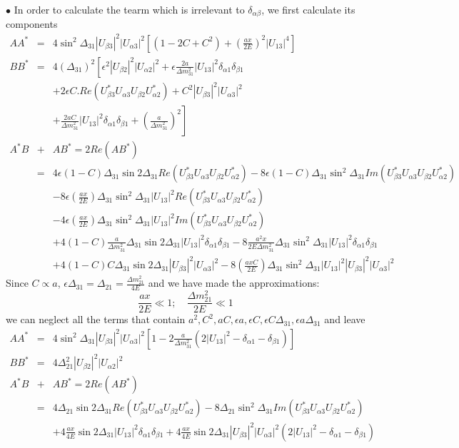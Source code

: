 \documentclass[a4 paper,12pt]{report}%
\begin{document}
$\bullet$ In order to calculate the tearm which is irrelevant to $\delta_{\alpha\beta}$, we first calculate its components
 \begin{eqnarray} \nonumber
AA^* &=&4\sin^2\Delta_{31}|U_{\beta 3}|^2|U_{\alpha 3}|^2\left[(1-2C+C^2) + \left(\frac{ax}{2E}\right)^2|U_{13}|^4\right]\\ \nonumber
BB^*& =&4(\Delta_{31})^2\left[\epsilon^2|U_{\beta 2}|^2|U_{\alpha 2}|^2 + \epsilon \frac{2a}{\Delta m^2_{31}}|U_{13}|^2\delta_{\alpha 1}\delta_{\beta 1}\right.\\ \nonumber
&&+2\epsilon C.Re(U^*_{\beta 3}U_{\alpha 3}U_{\beta 2}U^*_{\alpha 2}) + C^2|U_{\beta 3}|^2|U_{\alpha 3}|^2 \\ \nonumber
&&\left.+ \frac{2aC}{\Delta m^2_{31}}|U_{13}|^2\delta_{\alpha 1}\delta_{\beta 1}+\left(\frac{a}{\Delta m^2_{31}}\right)^2\right]\\ \nonumber
A^*B &+& AB^* = 2Re(AB^*)\\ \nonumber
&=&4\epsilon (1-C)\Delta_{31}\sin2\Delta_{31}Re(U^*_{\beta 3}U_{\alpha 3}U_{\beta 2}U^*_{\alpha 2}) - 8\epsilon (1-C)\Delta_{31}\sin^2\Delta_{31}Im(U^*_{\beta 3}U_{\alpha 3}U_{\beta 2}U^*_{\alpha 2})\\ \nonumber
&&-8\epsilon \left(\frac{ax}{2E}\right)\Delta_{31}\sin^2\Delta_{31}|U_{13}|^2Re(U^*_{\beta 3}U_{\alpha 3}U_{\beta 2}U^*_{\alpha 2})\\ \nonumber
&&-4\epsilon \left(\frac{ax}{2E}\right)\Delta_{31}\sin^2\Delta_{31}|U_{13}|^2Im(U^*_{\beta 3}U_{\alpha 3}U_{\beta 2}U^*_{\alpha 2})\\ \nonumber
&&+4(1-C)\frac{a}{\Delta m^2_{31}}\Delta_{31}\sin2\Delta_{31}|U_{13}|^2\delta_{\alpha 1}\delta_{\beta 1}-8\frac{a^2x}{2E\Delta m^2_{31}}\Delta_{31}\sin^2\Delta_{31}|U_{13}|^2\delta_{\alpha 1}\delta_{\beta 1}\\ \nonumber
&&+4(1-C)C\Delta_{31}\sin2\Delta_{31}|U_{\beta 3}|^2|U_{\alpha 3}|^2-8\left(\frac{axC}{2E}\right)\Delta_{31}\sin^2\Delta_{31}|U_{13}|^2|U_{\beta 3}|^2|U_{\alpha 3}|^2
\end{eqnarray}
Since $C\propto a$, $\epsilon \Delta_{31} = \Delta_{21} = \frac{\Delta m^2_{21}}{4E}$ and we have made the approximations:
$$\frac{ax}{2E}\ll 1; \quad \frac{\Delta m^2_{21}}{2E} \ll 1$$
we can neglect all the terms that contain $a^2, C^2, aC, \epsilon a, \epsilon C, \epsilon C\Delta_{31}, \epsilon a\Delta_{31}$ and leave
 \begin{eqnarray} \nonumber
AA^* &=&4\sin^2\Delta_{31}|U_{\beta 3}|^2|U_{\alpha 3}|^2\left[1-2\frac{a}{\Delta m^2_{31}}(2|U_{13}|^2- \delta_{\alpha 1} - \delta_{\beta 1})\right]\\ \nonumber
BB^*& =&4\Delta_{21}^2|U_{\beta 2}|^2|U_{\alpha 2}|^2 \\ \nonumber
A^*B &+& AB^* = 2Re(AB^*)\\ \nonumber
&=&4\Delta_{21}\sin2\Delta_{31}Re(U^*_{\beta 3}U_{\alpha 3}U_{\beta 2}U^*_{\alpha 2}) - 8 \Delta_{21}\sin^2\Delta_{31}Im(U^*_{\beta 3}U_{\alpha 3}U_{\beta 2}U^*_{\alpha 2})\\ \nonumber
&&+4\frac{ax}{4E}\sin2\Delta_{31}|U_{13}|^2\delta_{\alpha 1}\delta_{\beta 1}+4\frac{ax}{4E}\sin2\Delta_{31}|U_{\beta 3}|^2|U_{\alpha 3}|^2(2|U_{13}|^2-\delta_{\alpha 1}-\delta_{\beta 1})
\end{eqnarray}
\end{document}
